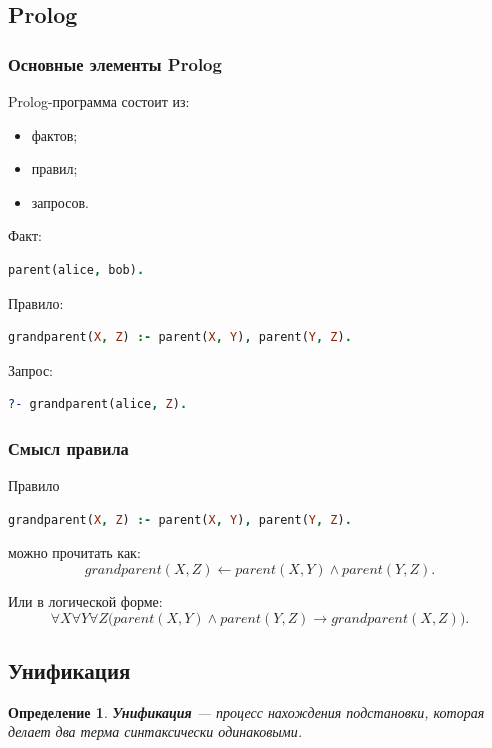 \documentclass[12pt,a4paper]{article}
\newtheorem{definition}{Определение}
\begin{document}
\subsection{Prolog}

\subsubsection{Основные элементы Prolog}

Prolog-программа состоит из:
\begin{itemize}
    \item фактов;
    \item правил;
    \item запросов.
\end{itemize}

Факт:
\begin{lstlisting}[language=Prolog]
parent(alice, bob).
\end{lstlisting}

Правило:
\begin{lstlisting}[language=Prolog]
grandparent(X, Z) :- parent(X, Y), parent(Y, Z).
\end{lstlisting}

Запрос:
\begin{lstlisting}[language=Prolog]
?- grandparent(alice, Z).
\end{lstlisting}

\subsubsection{Смысл правила}

Правило
\begin{lstlisting}[language=Prolog]
grandparent(X, Z) :- parent(X, Y), parent(Y, Z).
\end{lstlisting}
можно прочитать как:
$$
grandparent(X,Z) \leftarrow parent(X,Y) \land parent(Y,Z).
$$

Или в логической форме:
$$
\forall X \forall Y \forall Z
\bigl(parent(X,Y) \land parent(Y,Z) \to grandparent(X,Z)\bigr).
$$

\subsection{Унификация}

\begin{definition}
\textbf{Унификация} --- процесс нахождения подстановки, которая делает два терма синтаксически одинаковыми.
\end{definition}
\end{document}
